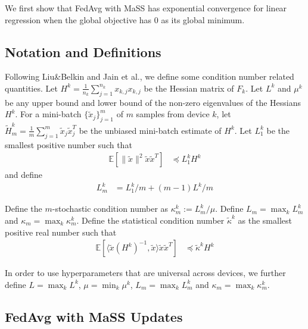 We first show that FedAvg with MaSS has exponential convergence for
linear regression when the global objective has 0 as its global minimum.

\subsection{Notation and Definitions}

Following Liu\&Belkin and Jain et al., we define some condition number
related quantities. Let $H^{k}=\frac{1}{n_{k}}\sum_{j=1}^{n_{k}}x_{k,j}x_{k,j}$
be the Hessian matrix of $F_{k}$. Let $L^{k}$ and $\mu^{k}$ be
any upper bound and lower bound of the non-zero eigenvalues of the
Hessians $H^{k}$. For a mini-batch $\{\tilde{x}_{j}\}_{j=1}^{m}$
of $m$ samples from device $k$, let $\tilde{H}_{m}^{k}=\frac{1}{m}\sum_{j=1}^{m}\tilde{x}_{j}\tilde{x}_{j}^{T}$
be the unbiased mini-batch estimate of $H^{k}$. Let $L_{1}^{k}$
be the smallest positive number such that 
\begin{align*}
\mathbb{E}\left[\|\tilde{x}\|^{2}\tilde{x}\tilde{x}^{T}\right] & \preceq L_{1}^{k}H^{k}
\end{align*}
and define 
\begin{align*}
L_{m}^{k} & =L_{1}^{k}/m+(m-1)L^{k}/m
\end{align*}

Define the $m$-stochastic condition number as $\kappa_{m}^{k}:=L_{m}^{k}/\mu$.
Define $L_{m}=\max_{k}L_{m}^{k}$ and $\kappa_{m}=\max_{k}\kappa_{m}^{k}$.
Define the statistical condition number $\tilde{\kappa}^{k}$ as the
smallest positive real number such that 
\begin{align*}
\mathbb{E}\left[\langle\tilde{x}(H^{k})^{-1},\tilde{x}\rangle\tilde{x}\tilde{x}^{T}\right] & \preceq\tilde{\kappa}^{k}H^{k}
\end{align*}

In order to use hyperparameters that are universal across devices,
we further define $L=\max_{k}L^{k}$, $\mu=\min_{k}\mu^{k}$, $L_{m}=\max_{k}L_{m}^{k}$
and $\kappa_{m}=\max_{k}\kappa_{m}^{k}$. 

\subsection{FedAvg with MaSS Updates}

